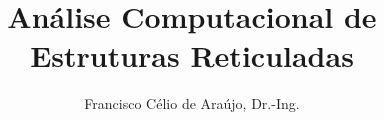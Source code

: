 \begin{titlepage}
	\begin{titlepagerule}
		\title{Análise Computacional de \\ Estruturas Reticuladas}
	\end{titlepagerule}



	\author{Francisco Célio de Araújo, Dr.-Ing.}
	\address{Departamento de Engenharia Civil\\Escola de Minas\\Universidade Federal de Outro Preto}
\end{titlepage}

